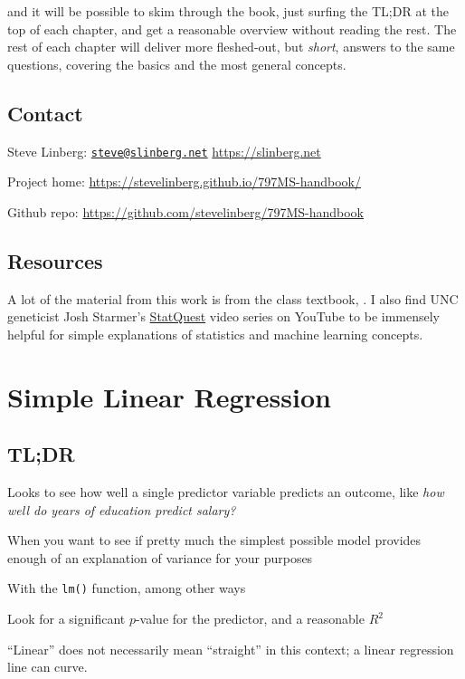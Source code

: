 \documentclass[
]{book}
\providecommand{\tightlist}{%
  \setlength{\itemsep}{0pt}\setlength{\parskip}{0pt}}
\begin{document}
and it will be possible to skim through the book, just surfing the TL;DR at the top of each chapter, and get a reasonable overview without reading the rest. The rest of each chapter will deliver more fleshed-out, but \emph{short}, answers to the same questions, covering the basics and the most general concepts.

\hypertarget{contact}{%
\section{Contact}\label{contact}}

Steve Linberg: \href{mailto:steve@slinberg.net}{\nolinkurl{steve@slinberg.net}} \textbar\textbar{} \url{https://slinberg.net}

Project home: \url{https://stevelinberg.github.io/797MS-handbook/}

Github repo: \url{https://github.com/stevelinberg/797MS-handbook}

\hypertarget{resources}{%
\section{Resources}\label{resources}}

A lot of the material from this work is from the class textbook, \citet{ISLR}. I also find UNC geneticist Josh Starmer's \href{https://www.youtube.com/channel/UCtYLUTtgS3k1Fg4y5tAhLbw}{StatQuest} video series on YouTube to be immensely helpful for simple explanations of statistics and machine learning concepts.

\hypertarget{simple-linear-regression}{%
\chapter{Simple Linear Regression}\label{simple-linear-regression}}

\hypertarget{tldr}{%
\section{TL;DR}\label{tldr}}

\begin{description}
\tightlist
\item[What it does]
Looks to see how well a single predictor variable predicts an outcome, like \emph{how well do years of education predict salary?}
\item[When to do it]
When you want to see if pretty much the simplest possible model provides enough of an explanation of variance for your purposes
\item[How to do it]
With the \texttt{lm()} function, among other ways
\item[How to assess it]
Look for a significant \(p\)-value for the predictor, and a reasonable \(R^2\)
\item[Note]
``Linear'' does not necessarily mean ``straight'' in this context; a linear regression line can curve.
\end{description}
\end{document}
